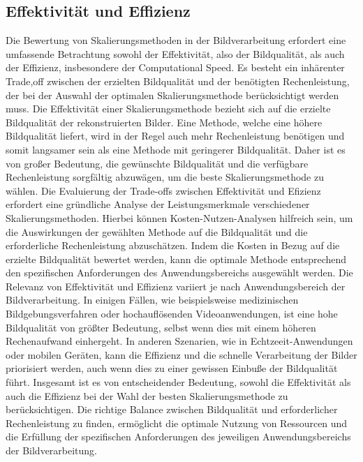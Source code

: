     \subsection{Effektivität und Effizienz}

        Die Bewertung von Skalierungsmethoden in der Bildverarbeitung erfordert eine umfassende Betrachtung sowohl der Effektivität, also der Bildqualität, als auch der Effizienz, insbesondere der Computational Speed. 
        Es besteht ein inhärenter Trade,off zwischen der erzielten Bildqualität und der benötigten Rechenleistung, der bei der Auswahl der optimalen Skalierungsmethode berücksichtigt werden muss.
        Die Effektivität einer Skalierungsmethode bezieht sich auf die erzielte Bildqualität der rekonstruierten Bilder. 
        Eine Methode, welche eine höhere Bildqualität liefert, wird in der Regel auch mehr Rechenleistung benötigen und somit langsamer sein als eine Methode mit geringerer Bildqualität. 
        Daher ist es von großer Bedeutung, die gewünschte Bildqualität und die verfügbare Rechenleistung sorgfältig abzuwägen, um die beste Skalierungsmethode zu wählen.
        Die Evaluierung der Trade-offs zwischen Effektivität und Efizienz erfordert eine gründliche Analyse der Leistungsmerkmale verschiedener Skalierungsmethoden. 
        Hierbei können Kosten-Nutzen-Analysen hilfreich sein, um die Auswirkungen der gewählten Methode auf die Bildqualität und die erforderliche Rechenleistung abzuschätzen. 
        Indem die Kosten in Bezug auf die erzielte Bildqualität bewertet werden, kann die optimale Methode entsprechend den spezifischen Anforderungen des Anwendungsbereichs ausgewählt werden.
        Die Relevanz von Effektivität und Effizienz variiert je nach Anwendungsbereich der Bildverarbeitung. 
        In einigen Fällen, wie beispielsweise medizinischen Bildgebungsverfahren oder hochauflösenden Videoanwendungen, ist eine hohe Bildqualität von größter Bedeutung, selbst wenn dies mit einem höheren Rechenaufwand einhergeht. 
        In anderen Szenarien, wie in Echtzeeit-Anwendungen oder mobilen Geräten, kann die Effizienz und die schnelle Verarbeitung der Bilder priorisiert werden, auch wenn dies zu einer gewissen Einbuße der Bildqualität führt.
        Insgesamt ist es von entscheidender Bedeutung, sowohl die Effektivität als auch die Effizienz bei der Wahl der besten Skalierungsmethode zu berücksichtigen. 
        Die richtige Balance zwischen Bildqualität und erforderlicher Rechenleistung zu finden, ermöglicht die optimale Nutzung von Ressourcen und die Erfüllung der spezifischen Anforderungen des jeweiligen Anwendungsbereichs der Bildverarbeitung.

